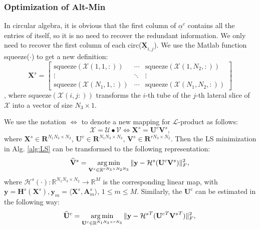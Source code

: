 \documentclass[futureinternet,article,submit,moreauthors,pdftex,10pt,a4paper]{Definitions/mdpi}
\theoremstyle{plain}
\theoremstyle{definition}
\theoremstyle{remark}
\begin{document}
\subsubsection{Optimization of Alt-Min}
In circular algebra, it is obvious that the first column of $\underline{\alpha}^c$ contains all the entries of itself, so it is no need to recover the redundant information. We only need to recover the first column of each circ($\underline{\mathbf{X}}_{i,j}$). We use the Matlab function squeeze($\cdot$)  to get a new definition:
\[
    \mathbf{X}^s = \begin{bmatrix}
        \text{squeeze}(\mathcal{X}(1,1,:)) & \cdots & \text{squeeze}(\mathcal{X}(1,N_2,:)) \\
        \vdots & \ddots & \vdots \\
        \text{squeeze}(\mathcal{X}(N_1,1,:)) & \cdots & \text{squeeze}(\mathcal{X}(N_1,N_2,:))
    \end{bmatrix}
\],
where squeeze$(\mathcal{X}(i,j:))$ transforms the $i$-th tube of the $j$-th lateral slice of $\mathcal{X}$ into a vector of size $N_3 \times 1$.

We use the notation $\Leftrightarrow$ to denote a new mapping for $\mathcal{L}$-product as follows:
\begin{equation}
    \mathcal{X} = \mathcal{U}\bullet \mathcal{V} \Leftrightarrow \mathbf{X}^s = \mathbf{U}^c\mathbf{V}^s,
\end{equation}
where $\mathbf{X}^s \in \mathbf{R}^{N_1N_3 \times N_2}$, $\mathbf{U}^c \in \mathbf{R}^{N_1N_3 \times N_3}$, $\mathbf{V}^s \in \mathbf{R}^{rN_3 \times N_2}$. Then the LS minimization in Alg. \ref{alg:LS} can be transformed to the following representation:
\begin{equation}
    \widehat{\mathbf{V}}^s = 
    \mathop{\arg\min}_{ \mathbf{V}^s \in \mathbb{R}^{rN_3 \times N_2N_3}} \| \mathbf{y} - \mathcal{H}^s(\mathbf{U}^c\mathbf{V}^s) \|_F^2 , \\
\end{equation}
where $\mathcal{H}^s(\cdot):\mathbb{R}^{N_1N_3\times N_2} \to \mathbb{R}^{M}$ is the corresponding linear map, with $\mathbf{y} = \mathbf{H}^s(\mathbf{X}^s), \mathbf{y}_m = \langle \mathbf{X}^s, \mathbf{A}^s_m \rangle$, $1 \leq m \leq M$.
Similarly, the $\mathbf{U}^c$ can be estimated in the following way:
\begin{equation}
    \widehat{\mathbf{U}}^c = 
    \mathop{\arg\min}_{ \mathbf{U}^c \in \mathbb{R}^{N_1N_3 \times rN_3}} \| \mathbf{y} - {\mathcal{H}^s}^T({\mathbf{U}^c}^T{\mathbf{V}^s}^T) \|_F^2, \\
\end{equation}
\end{document}
